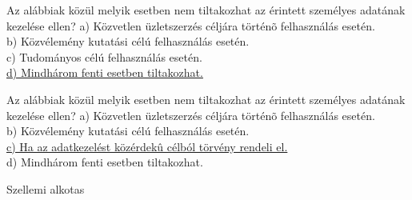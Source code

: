 \begin{frame}

\begin{tcolorbox}[title={179. Kérdés}]
Az alábbiak közül melyik esetben nem tiltakozhat az érintett személyes adatának kezelése ellen?
\tcblower
a) Közvetlen üzletszerzés céljára történõ felhasználás esetén.\\
b) Közvélemény kutatási célú felhasználás esetén.\\
c) Tudományos célú felhasználás esetén.\\
\uline {d) Mindhárom fenti esetben tiltakozhat.}
\end{tcolorbox}

\begin{tcolorbox}[title={179/A. Kérdés}]
Az alábbiak közül melyik esetben nem tiltakozhat az érintett személyes adatának kezelése ellen?
\tcblower
a) Közvetlen üzletszerzés céljára történõ felhasználás esetén.\\
b) Közvélemény kutatási célú felhasználás esetén.\\
\uline {c) Ha az adatkezelést közérdekû célból törvény rendeli el.}\\
d) Mindhárom fenti esetben tiltakozhat.
\end{tcolorbox}

\end{frame}

\begin{frame}[plain]
\begin{tcolorbox}[center, colback={myyellow}, coltext={black}, colframe={myyellow}]
    { Szellemi alkotas}\\
\end{tcolorbox}
\end{frame}


